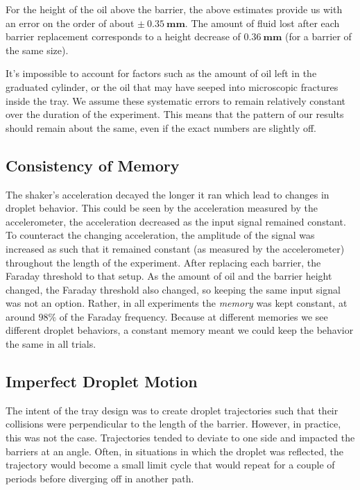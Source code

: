 For the height of the oil above the barrier, the above estimates provide us with an error on the order of about $\mathbf{\pm~0.35~\mathrm{\textbf{mm}}}$. The amount of fluid lost after each barrier replacement corresponds to a height decrease of $\mathbf{0.36~\mathrm{\textbf{mm}}}$ (for a barrier of the same size).

It's impossible to account for factors such as the amount of oil left in the graduated cylinder, or the oil that may have seeped into microscopic fractures inside the tray. We assume these systematic errors to remain relatively constant over the duration of the experiment. This means that the pattern of our results should remain about the same, even if the exact numbers are slightly off. 

    \subsection{Consistency of Memory}
The shaker's acceleration decayed the longer it ran which lead to changes in droplet behavior. This could be seen by the acceleration measured by the accelerometer, the acceleration decreased as the input signal remained constant. To counteract the changing acceleration, the amplitude of the signal was increased as such that it remained constant (as measured by the accelerometer) throughout the length of the experiment. After replacing each barrier, the Faraday threshold to that setup. As the amount of oil and the barrier height changed, the Faraday threshold also changed, so keeping the same input signal was not an option. Rather, in all experiments the \textit{memory} was kept constant, at around $98\%$ of the Faraday frequency. Because at different memories we see different droplet behaviors, a constant memory meant we could keep the behavior the same in all trials. 

    \subsection{Imperfect Droplet Motion}
The intent of the tray design was to create droplet trajectories such that their collisions were perpendicular to the length of the barrier. However, in practice, this was not the case. Trajectories tended to deviate to one side and impacted the barriers at an angle. Often, in situations in which the droplet was reflected, the trajectory would become a small limit cycle that would repeat for a couple of periods before diverging off in another path. 

